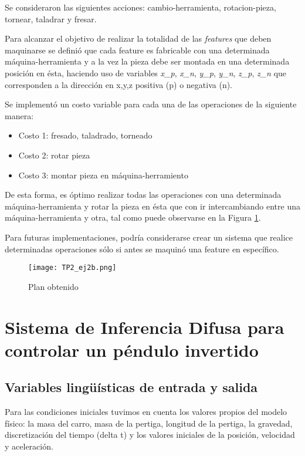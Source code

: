 \documentclass{article}
\begin{document}
Se consideraron las siguientes acciones: cambio-herramienta, rotacion-pieza, tornear, taladrar y fresar.

Para alcanzar el objetivo de realizar la totalidad de las \textit{features} que deben maquinarse se definió que cada feature es fabricable con una determinada máquina-herramienta y a la vez la pieza debe ser montada en una determinada posición en ésta, haciendo uso de variables \textit{x\_p}, \textit{x\_n}, \textit{y\_p}, \textit{y\_n}, \textit{z\_p}, \textit{z\_n} que corresponden a la dirección en x,y,z positiva (p) o negativa (n). 

Se implementó un costo variable para cada una de las operaciones de la siguiente manera:

\begin{itemize}
    \item Costo 1: fresado, taladrado, torneado
    \item Costo 2: rotar pieza
    \item Costo 3: montar pieza en máquina-herramiento
\end{itemize}

De esta forma, es óptimo realizar todas las operaciones con una determinada máquina-herramienta y rotar la pieza en ésta que con ir intercambiando entre una máquina-herramienta y otra, tal como puede observarse en la Figura \ref{fig:TP2_ej2b}.

Para futuras implementaciones, podría considerarse crear un sistema que realice determinadas operaciones sólo si antes se maquinó una feature en específico.

\begin{figure}[ht]
    \centering
    \texttt{[image: TP2\_ej2b.png]}
    \caption{Plan obtenido}
    \label{fig:TP2_ej2b}
\end{figure}

\section{Sistema de Inferencia Difusa para controlar un péndulo invertido}

\subsection{Variables lingüísticas de entrada y salida}

Para las condiciones iniciales tuvimos en cuenta los valores propios del modelo físico: la masa del carro, masa de la pertiga, longitud de la pertiga, la gravedad, discretización del tiempo (delta t) y los valores iniciales de la posición, velocidad y aceleración.
\end{document}

